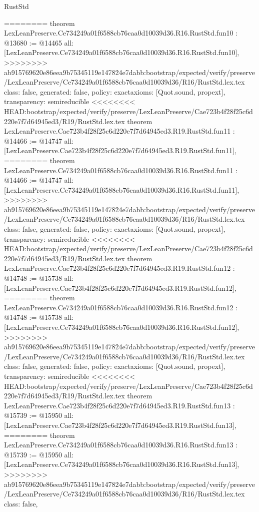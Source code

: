 \begin{lexlean}{RustStd}
\begin{coremodule}
{\begin{coremodule}
{{{{{{{{{{{{{========
theorem LexLeanPreserve.Ce734249a01f6588cb76caa0d10039d36.R16.RustStd.fun10 : @13680 := @14465 {
  all: [LexLeanPreserve.Ce734249a01f6588cb76caa0d10039d36.R16.RustStd.fun10],
>>>>>>>> ab915769620e86eea9b75345119e147824e7dabb:bootstrap/expected/verify/preserve/LexLeanPreserve/Ce734249a01f6588cb76caa0d10039d36/R16/RustStd.lex.tex
  class: false,
  generated: false,
  policy: exact{axioms: [Quot.sound, propext]},
  transparency: semireducible
}
<<<<<<<< HEAD:bootstrap/expected/verify/preserve/LexLeanPreserve/Cae723b4f28f25c6d220e7f7d64945ed3/R19/RustStd.lex.tex
theorem LexLeanPreserve.Cae723b4f28f25c6d220e7f7d64945ed3.R19.RustStd.fun11 : @14466 := @14747 {
  all: [LexLeanPreserve.Cae723b4f28f25c6d220e7f7d64945ed3.R19.RustStd.fun11],
========
theorem LexLeanPreserve.Ce734249a01f6588cb76caa0d10039d36.R16.RustStd.fun11 : @14466 := @14747 {
  all: [LexLeanPreserve.Ce734249a01f6588cb76caa0d10039d36.R16.RustStd.fun11],
>>>>>>>> ab915769620e86eea9b75345119e147824e7dabb:bootstrap/expected/verify/preserve/LexLeanPreserve/Ce734249a01f6588cb76caa0d10039d36/R16/RustStd.lex.tex
  class: false,
  generated: false,
  policy: exact{axioms: [Quot.sound, propext]},
  transparency: semireducible
}
<<<<<<<< HEAD:bootstrap/expected/verify/preserve/LexLeanPreserve/Cae723b4f28f25c6d220e7f7d64945ed3/R19/RustStd.lex.tex
theorem LexLeanPreserve.Cae723b4f28f25c6d220e7f7d64945ed3.R19.RustStd.fun12 : @14748 := @15738 {
  all: [LexLeanPreserve.Cae723b4f28f25c6d220e7f7d64945ed3.R19.RustStd.fun12],
========
theorem LexLeanPreserve.Ce734249a01f6588cb76caa0d10039d36.R16.RustStd.fun12 : @14748 := @15738 {
  all: [LexLeanPreserve.Ce734249a01f6588cb76caa0d10039d36.R16.RustStd.fun12],
>>>>>>>> ab915769620e86eea9b75345119e147824e7dabb:bootstrap/expected/verify/preserve/LexLeanPreserve/Ce734249a01f6588cb76caa0d10039d36/R16/RustStd.lex.tex
  class: false,
  generated: false,
  policy: exact{axioms: [Quot.sound, propext]},
  transparency: semireducible
}
<<<<<<<< HEAD:bootstrap/expected/verify/preserve/LexLeanPreserve/Cae723b4f28f25c6d220e7f7d64945ed3/R19/RustStd.lex.tex
theorem LexLeanPreserve.Cae723b4f28f25c6d220e7f7d64945ed3.R19.RustStd.fun13 : @15739 := @15950 {
  all: [LexLeanPreserve.Cae723b4f28f25c6d220e7f7d64945ed3.R19.RustStd.fun13],
========
theorem LexLeanPreserve.Ce734249a01f6588cb76caa0d10039d36.R16.RustStd.fun13 : @15739 := @15950 {
  all: [LexLeanPreserve.Ce734249a01f6588cb76caa0d10039d36.R16.RustStd.fun13],
>>>>>>>> ab915769620e86eea9b75345119e147824e7dabb:bootstrap/expected/verify/preserve/LexLeanPreserve/Ce734249a01f6588cb76caa0d10039d36/R16/RustStd.lex.tex
  class: false,
}}}}}}}}}}}}}}}}}
\end{coremodule}}
\end{coremodule}
\end{lexlean}
